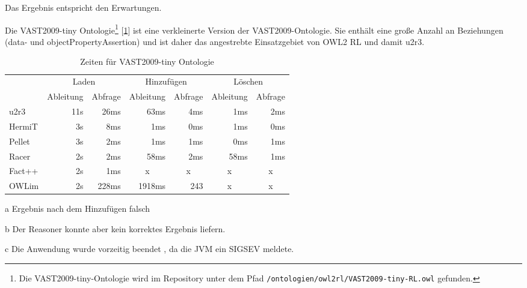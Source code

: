 Das Ergebnis entspricht den Erwartungen.

Die VAST2009-tiny Ontologie\footnote{Die VAST2009-tiny-Ontologie wird im Repository unter dem Pfad \texttt{/ontologien/owl2rl/VAST2009-tiny-RL.owl} gefunden.} [\ref{table-time-vast-tiny}] ist eine verkleinerte Version der VAST2009-Ontologie. Sie enthält eine große Anzahl an Beziehungen (data- und objectPropertyAssertion) und ist daher das angestrebte Einsatzgebiet von OWL2 RL und damit u2r3.

\begin{table}[htbp]
\caption{Zeiten für VAST2009-tiny Ontologie}
\label{table-time-vast-tiny}
\begin{center}
\begin{threeparttable}
\begin{tabular}{l|r|r|r|r|r|r|}
\cline{2-7}
 & \multicolumn{2}{|c|}{Laden} & \multicolumn{2}{|c|}{Hinzufügen} & \multicolumn{2}{|c|}{Löschen} \\
\cline{2-7}
 & \multicolumn{1}{|c|}{Ableitung} & \multicolumn{1}{|c|}{Abfrage} & \multicolumn{1}{|c|}{Ableitung} & \multicolumn{1}{|c|}{Abfrage} & \multicolumn{1}{|c|}{Ableitung} & \multicolumn{1}{|c|}{Abfrage} \\
\hline
\multicolumn{1}{|l|}{u2r3} & 11s & 26ms & 63ms & 4ms & 1ms & 2ms \\ \hline
\multicolumn{1}{|l|}{HermiT\tnote{a}} & 3s & 8ms & 1ms & 0ms & 1ms & 0ms \\ \hline
\multicolumn{1}{|l|}{Pellet\tnote{b}} & 3s & 2ms & 1ms & 1ms & 0ms & 1ms \\ \hline
\multicolumn{1}{|l|}{Racer\tnote{b}} & 2s & 2ms & 58ms & 2ms & 58ms & 1ms \\ \hline
\multicolumn{1}{|l|}{Fact++\tnote{c}} & 2s & 1ms & \multicolumn{1}{c|}{x} & \multicolumn{1}{c|}{x} & \multicolumn{1}{c|}{x} & \multicolumn{1}{c|}{x} \\ \hline
\multicolumn{1}{|l|}{OWLim} & 2s & 228ms & 1918ms & 243 & \multicolumn{1}{c|}{x} & \multicolumn{1}{c|}{x} \\ \hline
\end{tabular}
\begin{tablenotes}
	\item[a] Ergebnis nach dem Hinzufügen falsch
	\item[b] Der Reasoner konnte aber kein korrektes Ergebnis liefern.
	\item[c] Die Anwendung wurde vorzeitig beendet , da die JVM ein SIGSEV meldete.
\end{tablenotes}
\end{threeparttable}
\end{center}
\end{table}

